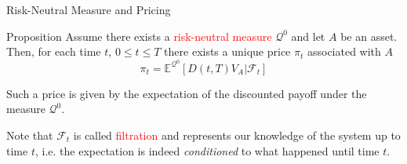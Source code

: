 \documentclass{beamer}
\begin{document}
\begin{frame}{Risk-Neutral Measure and Pricing}

\begin{block}{Proposition}
	Assume there exists a \textcolor{red}{risk-neutral measure} $\mathcal{Q}^0$ %
	and let $A$ be an asset. Then, for each time $t$, $0\le t\le T$ there exists a unique price $\pi_t$ associated with $A$
	\begin{equation}
		\pi_t = \mathbb{E}^{\mathcal{Q}^0}[D(t,T)V_A|\mathcal{F}_t]
		\label{eq:risk_neutral_pricing}
	\end{equation}
\end{block}

Such a price is given by the expectation of the discounted payoff under the measure $\mathcal{Q}^0$.

Note that $\mathcal{F}_t$ is called \textcolor{red}{filtration} and represents our knowledge of the system up to time $t$, i.e. the expectation is indeed \emph{conditioned} to what happened until time $t$.


\end{frame}
\end{document}
